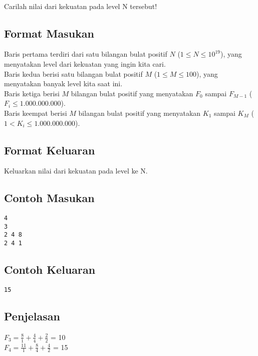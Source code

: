 \documentclass{article}
\begin{document}
\\
Carilah nilai dari kekuatan pada level N tersebut!

\subsection*{Format Masukan}

Baris pertama terdiri dari satu bilangan bulat positif $N$ ($1 \leq N \leq 10^{19}$), yang menyatakan level dari kekuatan yang ingin kita cari.\\
Baris kedua berisi satu bilangan bulat positif $M$ ($1 \leq M \leq 100$), yang menyatakan banyak level kita saat ini.\\
Baris ketiga berisi $M$ bilangan bulat positif yang menyatakan $F_0$ sampai $F_{M-1}$ ($F_i \leq 1.000.000.000$).\\
Baris keempat berisi $M$ bilangan bulat positif yang menyatakan $K_1$ sampai $K_{M}$ ($ 1 < K_i \leq 1.000.000.000 $).\\

\subsection*{Format Keluaran}

Keluarkan nilai dari kekuatan pada level ke N.
\\

\begin{multicols}{2}
\subsection*{Contoh Masukan}
\begin{lstlisting}
4
3
2 4 8
2 4 1
\end{lstlisting}
\columnbreak
\subsection*{Contoh Keluaran}
\begin{lstlisting}
15
\end{lstlisting}
\vfill
\null
\end{multicols}

\subsection*{Penjelasan}
\(F_3   = \frac{8}{1} + \frac{4}{4} + \frac{2}{2}\) = 10\\



\(F_4   = \frac{11}{1} + \frac{8}{4} + \frac{4}{2}\) = 15

\pagebreak
\end{document}
